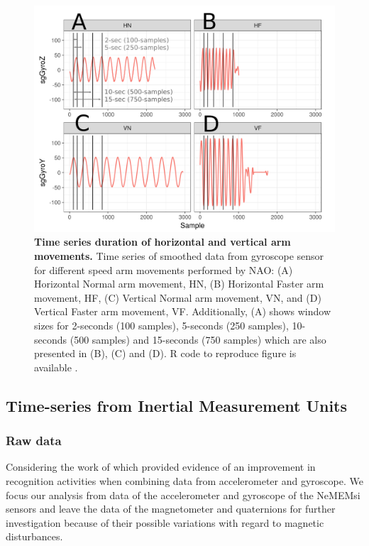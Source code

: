 \begin{figure}[!h] 
  \centering
  \includegraphics[width=1.0\textwidth]{sts}
    \caption{
	{\bf Time series duration of horizontal and vertical arm movements.} 
		Time series of smoothed data from gyroscope sensor 
		for different speed arm movements performed by NAO: 
		(A) Horizontal Normal arm movement, HN, 
		(B) Horizontal Faster arm movement, HF,
		(C) Vertical Normal arm movement, VN, and 
		(D) Vertical Faster arm movement, VF.
		Additionally, (A) shows window sizes for 2-seconds (100 samples), 
		5-seconds (250 samples), 10-seconds (500 samples) and 15-seconds (750 samples)
		which are also presented in (B), (C) and (D).
		R code to reproduce figure is available \cite{hwum2018}.
        }
	\label{fig:sts}
\end{figure}

\subsection{Time-series from Inertial Measurement Units} \label{sec:experiment:subsec:imu}


\subsubsection{Raw data}
Considering the work of \cite{shoaib2016} which provided evidence 
of an improvement in recognition activities when combining data 
from accelerometer and gyroscope.
We focus our analysis from data of the accelerometer and gyroscope
of the NeMEMsi sensors \cite{Comotti2014} and leave the data of 
the magnetometer and quaternions for further investigation 
because of their possible variations with regard to magnetic disturbances.

